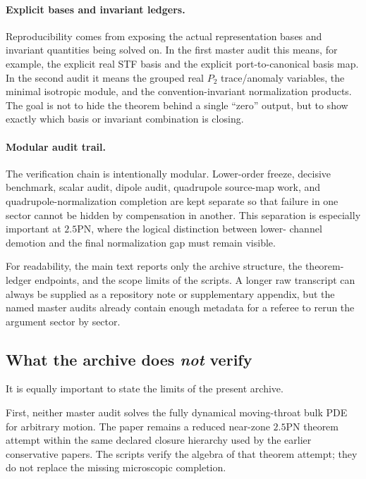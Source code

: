 \documentclass[11pt]{article}
\begin{document}
\paragraph{Explicit bases and invariant ledgers.}
Reproducibility comes from exposing the actual representation bases and invariant
quantities being solved on.  In the first master audit this means, for example,
the explicit real STF basis and the explicit port-to-canonical basis map.  In
the second audit it means the grouped real $P_2$ trace/anomaly variables, the
minimal isotropic module, and the convention-invariant normalization products.
The goal is not to hide the theorem behind a single ``zero'' output, but to show
exactly which basis or invariant combination is closing.

\paragraph{Modular audit trail.}
The verification chain is intentionally modular.  Lower-order freeze, decisive
benchmark, scalar audit, dipole audit, quadrupole source-map work, and
quadrupole-normalization completion are kept separate so that failure in one
sector cannot be hidden by compensation in another.  This separation is
especially important at $2.5$PN, where the logical distinction between lower-
channel demotion and the final normalization gap must remain visible.

For readability, the main text reports only the archive structure, the theorem-
ledger endpoints, and the scope limits of the scripts.  A longer raw transcript
can always be supplied as a repository note or supplementary appendix, but the
named master audits already contain enough metadata for a referee to rerun the
argument sector by sector.

\subsection{What the archive does \emph{not} verify}
\label{sec:verification-scope}

It is equally important to state the limits of the present archive.

First, neither master audit solves the fully dynamical moving-throat bulk PDE for
arbitrary motion.  The paper remains a reduced near-zone $2.5$PN theorem attempt
within the same declared closure hierarchy used by the earlier conservative
papers.  The scripts verify the algebra of that theorem attempt; they do not
replace the missing microscopic completion.
\end{document}
